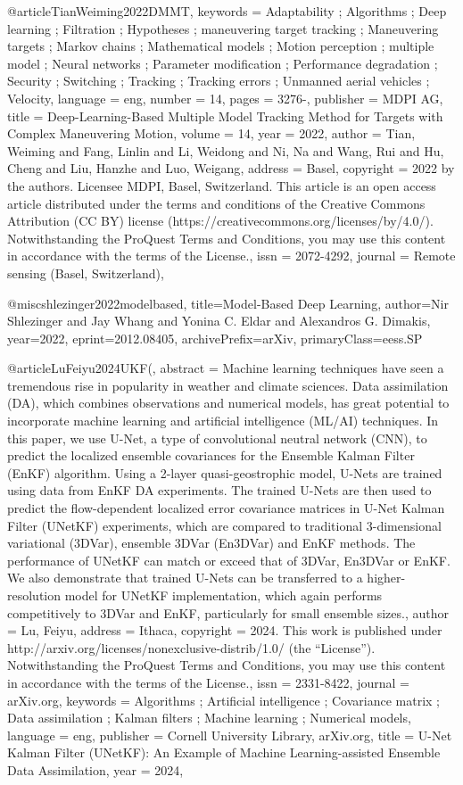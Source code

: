 @article{TianWeiming2022DMMT,
keywords = {Adaptability ; Algorithms ; Deep learning ; Filtration ; Hypotheses ; maneuvering target tracking ; Maneuvering targets ; Markov chains ; Mathematical models ; Motion perception ; multiple model ; Neural networks ; Parameter modification ; Performance degradation ; Security ; Switching ; Tracking ; Tracking errors ; Unmanned aerial vehicles ; Velocity},
language = {eng},
number = {14},
pages = {3276-},
publisher = {MDPI AG},
title = {Deep-Learning-Based Multiple Model Tracking Method for Targets with Complex Maneuvering Motion},
volume = {14},
year = {2022},
author = {Tian, Weiming and Fang, Linlin and Li, Weidong and Ni, Na and Wang, Rui and Hu, Cheng and Liu, Hanzhe and Luo, Weigang},
address = {Basel},
copyright = {2022 by the authors. Licensee MDPI, Basel, Switzerland. This article is an open access article distributed under the terms and conditions of the Creative Commons Attribution (CC BY) license (https://creativecommons.org/licenses/by/4.0/). Notwithstanding the ProQuest Terms and Conditions, you may use this content in accordance with the terms of the License.},
issn = {2072-4292},
journal = {Remote sensing (Basel, Switzerland)},
}

@misc{shlezinger2022modelbased,
      title={Model-Based Deep Learning}, 
      author={Nir Shlezinger and Jay Whang and Yonina C. Eldar and Alexandros G. Dimakis},
      year={2022},
      eprint={2012.08405},
      archivePrefix={arXiv},
      primaryClass={eess.SP}
}

@article{LuFeiyu2024UKF(,
abstract = {Machine learning techniques have seen a tremendous rise in popularity in weather and climate sciences. Data assimilation (DA), which combines observations and numerical models, has great potential to incorporate machine learning and artificial intelligence (ML/AI) techniques. In this paper, we use U-Net, a type of convolutional neutral network (CNN), to predict the localized ensemble covariances for the Ensemble Kalman Filter (EnKF) algorithm. Using a 2-layer quasi-geostrophic model, U-Nets are trained using data from EnKF DA experiments. The trained U-Nets are then used to predict the flow-dependent localized error covariance matrices in U-Net Kalman Filter (UNetKF) experiments, which are compared to traditional 3-dimensional variational (3DVar), ensemble 3DVar (En3DVar) and EnKF methods. The performance of UNetKF can match or exceed that of 3DVar, En3DVar or EnKF. We also demonstrate that trained U-Nets can be transferred to a higher-resolution model for UNetKF implementation, which again performs competitively to 3DVar and EnKF, particularly for small ensemble sizes.},
author = {Lu, Feiyu},
address = {Ithaca},
copyright = {2024. This work is published under http://arxiv.org/licenses/nonexclusive-distrib/1.0/ (the “License”). Notwithstanding the ProQuest Terms and Conditions, you may use this content in accordance with the terms of the License.},
issn = {2331-8422},
journal = {arXiv.org},
keywords = {Algorithms ; Artificial intelligence ; Covariance matrix ; Data assimilation ; Kalman filters ; Machine learning ; Numerical models},
language = {eng},
publisher = {Cornell University Library, arXiv.org},
title = {U-Net Kalman Filter (UNetKF): An Example of Machine Learning-assisted Ensemble Data Assimilation},
year = {2024},
}

